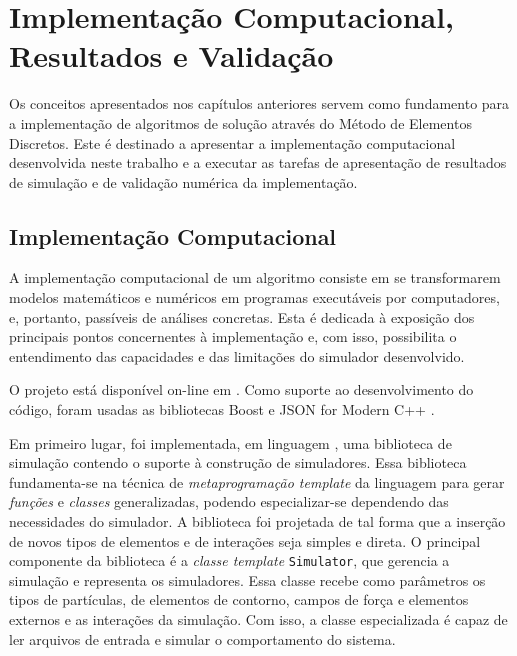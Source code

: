 \chapter{Implementação Computacional, Resultados e Validação} \label{ch:results}

Os conceitos apresentados nos capítulos anteriores servem como fundamento para a implementação de algoritmos de solução através do Método de Elementos Discretos. Este  é destinado a apresentar a implementação computacional desenvolvida neste trabalho e a executar as tarefas de apresentação de resultados de simulação e de validação numérica da implementação.

\section{Implementação Computacional} \label{sec:computational_implementation}

A implementação computacional de um algoritmo consiste em se transformarem modelos matemáticos e numéricos em programas executáveis por computadores, e, portanto, passíveis de análises concretas. Esta  é dedicada à exposição dos principais pontos concernentes à implementação e, com isso, possibilita o entendimento das capacidades e das limitações do simulador desenvolvido.

O projeto está disponível on-line em . Como suporte ao desenvolvimento do código, foram usadas as bibliotecas Boost \cite{bib:boost} e JSON for Modern C++ \cite{bib:nlohmann}.

Em primeiro lugar, foi implementada, em linguagem \CPP{}, uma biblioteca de simulação contendo o suporte à construção de simuladores. Essa biblioteca fundamenta-se na técnica de \textit{metaprogramação template} da linguagem para gerar \textit{funções} e \textit{classes} generalizadas, podendo especializar-se dependendo das necessidades do simulador. A biblioteca foi projetada de tal forma que a inserção de novos tipos de elementos e de interações seja simples e direta. O principal componente da biblioteca é a \textit{classe template} \lstinline[style=Inline C++]{Simulator}, que gerencia a simulação e representa os simuladores. Essa classe recebe como parâmetros os tipos de partículas, de elementos de contorno, campos de força e elementos externos e as interações da simulação. Com isso, a classe especializada é capaz de ler arquivos de entrada e simular o comportamento do sistema.

